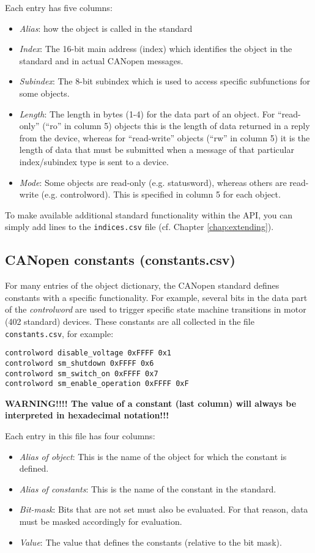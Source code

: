 Each entry has five columns:
\begin{itemize}
\item {\em Alias}: how the object is called in the standard
\item {\em Index}: The 16-bit main address (index) which identifies the object in the standard and in actual CANopen messages.
\item {\em Subindex}: The 8-bit subindex which is used to access specific subfunctions for some objects.
\item {\em Length}: The length in bytes (1-4) for the data part of an object. For ``read-only'' (``ro'' in column 5) objects this is the length of data returned in a reply from the device, whereas for ``read-write'' objects (``rw'' in column 5) it is the length of data that must be submitted when a message of that particular index/subindex type is sent to a device.
\item {\em Mode}: Some objects are read-only (e.g. statusword), whereas others are read-write (e.g. controlword). This is specified in column 5 for each object.
\end{itemize}

To make available additional standard functionality within the API, you can simply add lines to the \texttt{indices.csv} file (cf. Chapter \ref{chap:extending}).

\subsection{CANopen constants (constants.csv)}
\label{sec:constants}

For many entries of the object dictionary, the CANopen standard defines constants with a specific functionality. For example, several bits in the data part of the {\em controlword} are used to trigger specific state machine transitions in motor (402 standard) devices. These constants are all collected in the file \texttt{constants.csv}, for example:
\begin{verbatim}
controlword disable_voltage 0xFFFF 0x1
controlword sm_shutdown 0xFFFF 0x6
controlword sm_switch_on 0xFFFF 0x7
controlword sm_enable_operation 0xFFFF 0xF
\end{verbatim}
{\bf WARNING!!!! The value of a constant (last column) will always be interpreted in hexadecimal notation!!!}

Each entry in this file has four columns:
\begin{itemize}
\item {\em Alias of object}: This is the name of the object for which the constant is defined.
\item {\em Alias of constants}: This is the name of the constant in the standard.
\item {\em Bit-mask}: Bits that are not set must also be evaluated. For that reason, data must be masked accordingly for evaluation.
\item {\em Value}: The value that defines the constants (relative to the bit mask).
\end{itemize}

